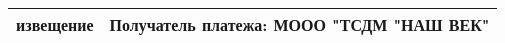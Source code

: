 \documentclass{article}
\begin{document}
  \begin{tabular}{p{} p{} p{}}
    \hline
    \multicolumn{1}{|c|}{извещение} &
    \multicolumn{2}{|c|}{Получатель платежа: МООО "ТСДМ "НАШ ВЕК"} \\
    \hline
  \end{tabular}
\end{document}
